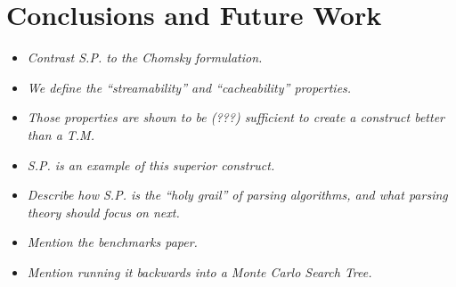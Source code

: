 \documentclass{article}
\begin{document}
\section{Conclusions and Future Work}
\begin{itemize}
  \item \textit{Contrast S.P. to the Chomsky formulation.}
  \item \textit{We define the ``streamability'' and ``cacheability'' properties.}
  \item \textit{Those properties are shown to be (???) sufficient to create a construct better than a T.M.}
  \item \textit{S.P. is an example of this superior construct.}
  \item \textit{Describe how S.P. is the ``holy grail'' of parsing algorithms, and what parsing theory should focus on next.}
  \item \textit{Mention the benchmarks paper.}
  \item \textit{Mention running it backwards into a Monte Carlo Search Tree.}
\end{itemize}
\end{document}
